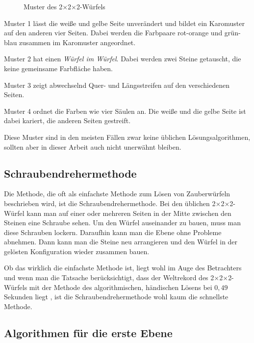 \documentclass[12pt,a4paper, usenames, dvipsnames]{article}
\theoremstyle{mystyle}
\theoremstyle{definition}
\newcommand{\Ttwo}{2$\times$2$\times$2-}
\begin{document}
\begin{figure}[h]
\caption{Muster des \Ttwo Würfels}
\label{29}
\end{figure}

Muster 1 lässt die weiße und gelbe Seite unverändert und bildet ein Karomuster auf den anderen vier Seiten. Dabei werden die Farbpaare rot-orange und grün-blau zusammen im  Karomuster angeordnet.

Muster 2 hat einen \textit{Würfel im Würfel}. Dabei werden zwei Steine getauscht, die keine gemeinsame Farbfläche haben.

Muster 3 zeigt abwechselnd Quer- und Längsstreifen auf den verschiedenen Seiten.

Muster 4 ordnet die Farben wie vier Säulen an. Die weiße und die gelbe Seite ist dabei kariert, die anderen Seiten gestreift.


Diese Muster sind in den meisten Fällen zwar keine üblichen Lösungsalgorithmen, sollten aber in dieser Arbeit auch nicht unerwähnt bleiben.

%
%
%
%
%
%
%
%
%
%
%
%
%
%
%
%
%
%
%
\subsection*{Schraubendrehermethode}

Die Methode, die oft als einfachste Methode zum Lösen von Zauberwürfeln beschrieben wird, ist die Schraubendrehermethode.
Bei den üblichen \Ttwo Würfel kann man auf einer oder mehreren Seiten in der Mitte zwischen den Steinen eine Schraube sehen.
Um den Würfel auseinander zu bauen, muss man diese Schrauben lockern. Daraufhin kann man die Ebene ohne Probleme abnehmen. 
Dann kann man die Steine neu arrangieren und den Würfel in der gelösten Konfiguration wieder zusammen bauen.

Ob das wirklich die einfachste Methode ist, liegt wohl im Auge des Betrachters und wenn man die Tatsache berücksichtigt, dass der Weltrekord des \Ttwo Würfels mit der Methode des algorithmischen, händischen Lösens bei $0,49$ Sekunden liegt \cite{rekord}, ist die Schraubendrehermethode wohl kaum die schnellste Methode.

%
%
%
%
%
%
%
%
%
%
%
%
%
%
%
%
%
%
%
\subsection*{Algorithmen für die erste Ebene}
\end{document}
